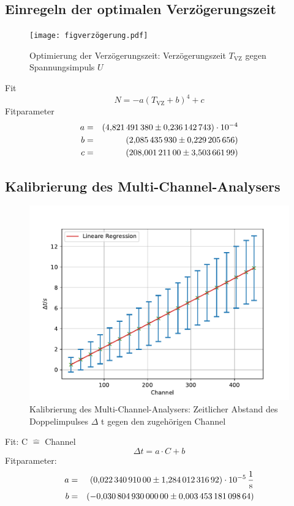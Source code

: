 \subsection{Einregeln der optimalen Verzögerungszeit}

\begin{figure}[h!]
  \centering
  \texttt{[image: figverzögerung.pdf]}
  \caption{Optimierung der Verzögerungszeit: Verzögerungszeit $T_{\text{VZ}}$ gegen Spannungsimpuls $U$}
  \label{fig:verzögerung}
\end{figure}
Fit
\begin{equation*}
  N = -a \left( T_{\text{VZ}} +b \right)^4+c
\end{equation*}
Fitparameter
\begin{align*}
  a &=& \SI{4.82149138 \pm 0.236142743e-04}{}\\
  b &=& \SI{2.08543593 \pm 0.229205656}{}\\
  c &=& \SI{208.001211 \pm 3.50366199}{}\\
\end{align*}

\FloatBarrier
\subsection{Kalibrierung des Multi-Channel-Analysers}

\begin{figure}[h!]
  \centering
  \includegraphics[width=\textwidth]{figkalibrierung.pdf}
  \caption{Kalibrierung des Multi-Channel-Analysers: Zeitlicher Abstand des Doppelimpulses $\Delta$ t gegen den zugehörigen Channel}
  \label{fig:kalibrierung}
\end{figure}
Fit: C $\widehat{=}$ Channel
\begin{equation*}
\Delta t = a \cdot C + b
\end{equation*}
Fitparameter:
\begin{align*}
a  &=&  \SI{ 0.02234091 \pm 1.28401231692e-05}{\frac{1}{s}}  \\
b  &=&  \SI{-0.03080493 \pm 0.00345318109864 }{}  \\
\end{align*}

